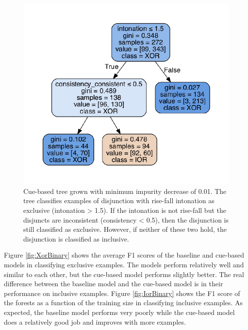 \documentclass[floatsintext,man]{apa6}
\theoremstyle{definition}
\theoremstyle{definition}
\theoremstyle{definition}
\theoremstyle{remark}
\begin{document}
\begin{figure}
\centering
\includegraphics{figs/binaryCueBased-1.pdf}
\caption{\label{fig:binaryCueBased}Cue-based tree grown with minimum
impurity decrease of 0.01. The tree classifies examples of disjunction
with rise-fall intonation as exclusive (intonation \textgreater{} 1.5).
If the intonation is not rise-fall but the disjuncts are inconsistent
(consistency \textless{} 0.5), then the disjunction is still classified
as exclusive. However, if neither of these two hold, the disjunction is
classified as inclusive.}
\end{figure}

Figure \ref{fig:XorBinary} shows the average F1 scores of the baseline
and cue-based models in classifying exclusive examples. The models
perform relatively well and similar to each other, but the cue-based
model performs slightly better. The real difference between the baseline
model and the cue-based model is in their performance on inclusive
examples. Figure \ref{fig:IorBinary} shows the F1 score of the forests
as a function of the training size in classifying inclusive examples. As
expected, the baseline model performs very poorly while the cue-based
model does a relatively good job and improves with more examples.
\end{document}
